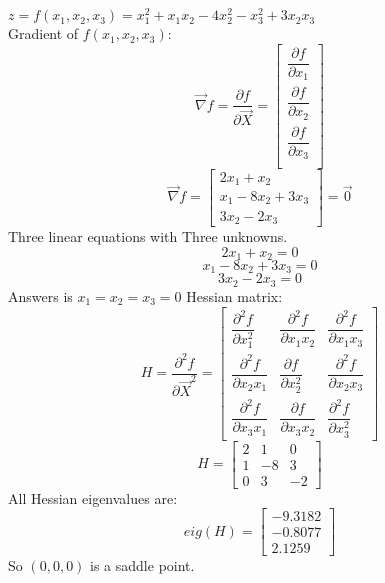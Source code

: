 $z = f(x_1, x_2, x_3) = x_1^2 + x_1x_2 - 4x_2^2-x_3^2 + 3x_2x_3$ \\
Gradient of $f(x_1, x_2, x_3)$:
$$\vec{\nabla} f = \dfrac{\partial f}{\partial \vec{X}}= \begin{bmatrix}
	\dfrac{\partial f}{\partial x_1} \\[8pt]
	\dfrac{\partial f}{\partial x_2} \\[8pt]
	\dfrac{\partial f}{\partial x_3} \\
\end{bmatrix} $$
$$\vec{\nabla} f =   \begin{bmatrix}
	2x_1 + x_2 \\
	x_1 -8x_2 + 3x_3 \\
	3x_2 - 2x_3
\end{bmatrix}  = \vec{0}$$
Three linear equations with Three unknowns.
$$	2x_1 + x_2 = 0 $$
$$x_1 -8x_2 + 3x_3 = 0$$
$$3x_2 - 2x_3 = 0 $$
Answers is $x_1 = x_2 = x_3 = 0$
Hessian matrix:
$$H = \dfrac{\partial^2 f}{\partial \vec{X}^2} = \begin{bmatrix}
	\dfrac{\partial^2 f}{\partial x_1^2} & \dfrac{\partial^2 f}{\partial x_1x_2} & \dfrac{\partial^2 f}{\partial x_1x_3} \\[8pt]
	\dfrac{\partial^2 f}{\partial x_2x_1}  & \dfrac{\partial f}{\partial x_2^2} & \dfrac{\partial^2 f}{\partial x_2x_3}  \\[8pt]
		\dfrac{\partial^2 f}{\partial x_3x_1}  & \dfrac{\partial f}{\partial x_3x_2} & \dfrac{\partial^2 f}{\partial x_3^2} 
\end{bmatrix} $$
$$H = \begin{bmatrix}
	2 & 1 & 0 \\
	1 & -8 & 3 \\
	0 & 3 & -2
\end{bmatrix}$$
All Hessian eigenvalues are:
$$eig(H) = \begin{bmatrix}
	-9.3182  \\
	-0.8077 \\
	2.1259
\end{bmatrix}$$
So $(0, 0, 0)$ is a saddle point.
